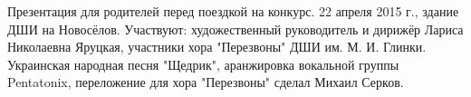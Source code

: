  
 
 
 
 


Презентация для родителей перед поездкой на конкурс. 
22 апреля 2015 г., здание ДШИ на Новосёлов. Участвуют: художественный руководитель и дирижёр Лариса Николаевна Яруцкая, участники хора "Перезвоны" ДШИ им. М. И. Глинки.
Украинская народная песня "Щедрик", аранжировка вокальной группы Pentatonix, переложение для хора "Перезвоны" сделал Михаил Серков.













